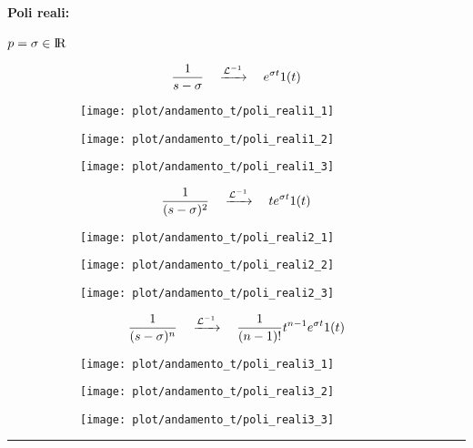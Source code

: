 \documentclass[../main.tex]{subfiles}
\begin{document}
	\paragraph{Poli reali:} $ p = \sigma \in \rm I\!R $
	\begin{figure}[H]
		\centering
		\[ \frac{1}{s-\sigma} \quad \xrightarrow{\mathcal{L}^{-1}} \quad e^{\sigma t} 1(t) \]
		\begin{subfigure}{0.3\textwidth}
			\texttt{[image: plot/andamento\_t/poli\_reali1\_1]}
		\end{subfigure}
		\begin{subfigure}{0.3\textwidth}
			\texttt{[image: plot/andamento\_t/poli\_reali1\_2]}
		\end{subfigure}
		\begin{subfigure}{0.3\textwidth}
			\texttt{[image: plot/andamento\_t/poli\_reali1\_3]}
		\end{subfigure}
	\end{figure}
	\begin{figure}[H]
		\[ \frac{1}{(s-\sigma)^2} \quad \xrightarrow{\mathcal{L}^{-1}} \quad t e^{\sigma t} 1(t) \]
		\centering
		\begin{subfigure}{0.3\textwidth}
			\texttt{[image: plot/andamento\_t/poli\_reali2\_1]}
		\end{subfigure}
		\begin{subfigure}{0.3\textwidth}
			\texttt{[image: plot/andamento\_t/poli\_reali2\_2]}
		\end{subfigure}
		\begin{subfigure}{0.3\textwidth}
			\texttt{[image: plot/andamento\_t/poli\_reali2\_3]}
		\end{subfigure}
	\end{figure}
	\begin{figure}[H]
		\[ \frac{1}{(s-\sigma)^n} \quad \xrightarrow{\mathcal{L}^{-1}} \quad \frac{1}{(n-1)!} t^{n-1} e^{\sigma t} 1(t) \]
		\centering
		\begin{subfigure}{0.3\textwidth}
			\texttt{[image: plot/andamento\_t/poli\_reali3\_1]}
		\end{subfigure}
		\begin{subfigure}{0.3\textwidth}
			\texttt{[image: plot/andamento\_t/poli\_reali3\_2]}
		\end{subfigure}
		\begin{subfigure}{0.3\textwidth}
			\texttt{[image: plot/andamento\_t/poli\_reali3\_3]}
		\end{subfigure}
	\end{figure}
	\rule{\linewidth}{0.4pt}\\%
\end{document}
